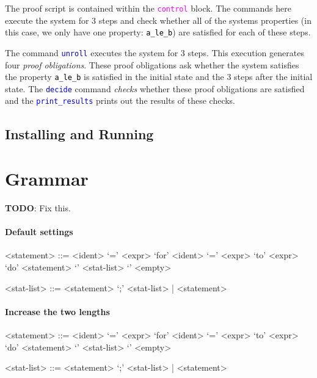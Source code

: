 \documentclass{article}
\newcommand{\uclid}{{\sc{Uclid}}}
\newcommand{\ident}[1]{\textcolor{black}{\texttt{#1}}}
\newcommand{\keywordbf}[1]{\textcolor{magenta}{\texttt{{#1}}}}
\newcommand{\proofcmd}[1]{\textcolor{blue}{\texttt{{#1}}}}
\begin{document}
The proof script is contained within the \keywordbf{control} block. The commands here execute the system for 3 steps and check whether all of the systems properties (in this case, we only have one property: \ident{a\_le\_b}) are satisfied for each of these steps. 

The command \proofcmd{unroll} executes the system for 3 steps. This execution generates four \emph{proof obligations}. These proof obligations ask whether the system satisfies the property \ident{a\_le\_b} is satisfied in the initial state and the 3 steps after the initial state. The \proofcmd{decide} command \emph{checks} whether these proof obligations are satisfied and the \proofcmd{print\_results} prints out the results of these checks.

\subsection{Installing and Running \uclid{}}

\section{\uclid{} Grammar}

\textbf{TODO}: Fix this.

\paragraph{Default settings}
\begin{grammar}

<statement> ::= <ident> `=' <expr>
\alt `for' <ident> `=' <expr> `to' <expr> `do' <statement>
\alt `{' <stat-list> `}'
\alt <empty>

<stat-list> ::= <statement> `;' <stat-list> | <statement>

\end{grammar}
\paragraph{Increase the two lengths}
\setlength{\grammarparsep}{20pt plus 1pt minus 1pt} %
\setlength{\grammarindent}{12em} %

\begin{grammar}

<statement> ::= <ident> `=' <expr>
\alt `for' <ident> `=' <expr> `to' <expr> `do' <statement>
\alt `{' <stat-list> `}'
\alt <empty>

<stat-list> ::= <statement> `;' <stat-list> | <statement>

\end{grammar}
\end{document}
